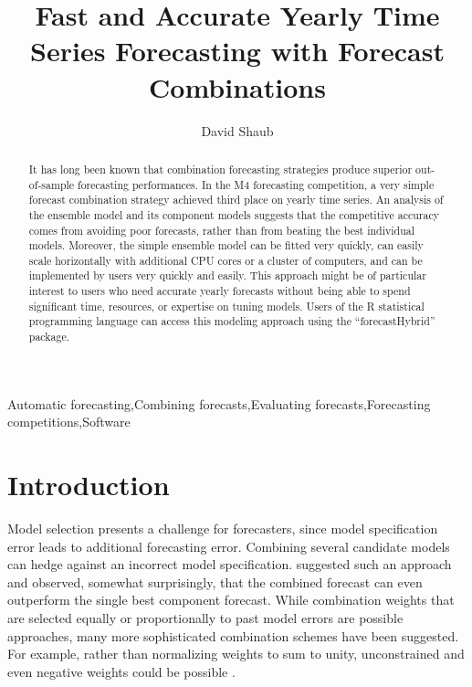 \documentclass[11pt,3p,review,authoryear]{elsarticle}
\begin{document}
\begin{frontmatter}

\title{Fast and Accurate Yearly Time Series Forecasting with Forecast Combinations}

\author[ss]{David Shaub}
\address[ss]{Harvard University Extension School}




\begin{abstract}
It has long been known that combination forecasting strategies produce superior out-of-sample forecasting performances. In the M4 forecasting competition, a very simple forecast combination strategy achieved third place on yearly time series. An analysis of the ensemble model and its component models suggests that the competitive accuracy comes from avoiding poor forecasts, rather than from beating the best individual models. Moreover, the simple ensemble model can be fitted very quickly, can easily scale horizontally with additional CPU cores or a cluster of computers, and can be implemented by users very quickly and easily. This approach might be of particular interest to users who need accurate yearly forecasts without being able to spend significant time, resources, or expertise on tuning models. Users of the R statistical programming language can access this modeling approach using the ``forecastHybrid'' package.
\end{abstract}

\begin{keyword}
Automatic forecasting\sep Combining forecasts\sep Evaluating forecasts\sep Forecasting competitions\sep Software
\end{keyword}

\end{frontmatter}


\section{Introduction}
Model selection presents a challenge for forecasters, since model specification error leads to additional forecasting error. Combining several candidate models can hedge against an incorrect model specification. \cite{BatesGranger1969} suggested such an approach and observed, somewhat surprisingly, that the combined forecast can even outperform the single best component forecast. While combination weights that are selected equally or proportionally to past model errors are possible approaches, many more sophisticated combination schemes have been suggested. For example, rather than normalizing weights to sum to unity, unconstrained and even negative weights could be possible \citep{GrangerRamanathan1984}.
\end{document}
